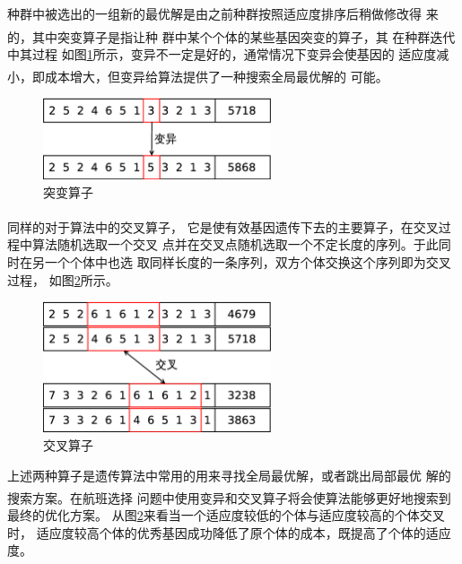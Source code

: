 \documentclass[fontset=fandol,a4paper,zihao=5]{ctexart}
\newcommand{\upcite}[1]{\textsuperscript{\textsuperscript{\cite{#1}}}}
\begin{document}
			种群中被选出的一组新的最优解是由之前种群按照适应度排序后稍做修改得
            来的\upcite{张铃2000遗传算法机理的研究}，其中突变算子是指让种
			群中某个个体的某些基因突变的算子，其 在种群迭代中其过程
            如图\ref{fig:muate}所示，变异不一定是好的，通常情况下变异会使基因的
            适应度减小，即成本增大，但变异给算法提供了一种搜索全局最优解的
            可能\upcite{Goldberg1989Genetic}。
			\begin{figure}[!htbp]
				\centering
				\includegraphics[width=0.6\textwidth]{pic/life_muate.eps}
				\caption{突变算子}
				\label{fig:muate}
			\end{figure}
			
			同样的对于算法中的交叉算子\upcite{胡中功2008群智能算法的研究进展}，
            它是使有效基因遗传下去的主要算子，在交叉过程中算法随机选取一个交叉
            点并在交叉点随机选取一个不定长度的序列。于此同时在另一个个体中也选
            取同样长度的一条序列，双方个体交换这个序列即为交叉过程，
            如图\ref{fig:cross}所示。
			\begin{figure}[!htbp]
				\centering
				\includegraphics[width=0.6\textwidth]{pic/life_cross.eps}
				\caption{交叉算子}
				\label{fig:cross}
			\end{figure}
		
			上述两种算子是遗传算法中常用的用来寻找全局最优解，或者跳出局部最优
            解的搜索方案\upcite{苗夺谦1999知识约简的一种启发式算法}。在航班选择
            问题中使用变异和交叉算子将会使算法能够更好地搜索到最终的优化方案。
            从图\ref{fig:cross}来看当一个适应度较低的个体与适应度较高的个体交叉时，
            适应度较高个体的优秀基因成功降低了原个体的成本，既提高了个体的适应度。
\end{document}
